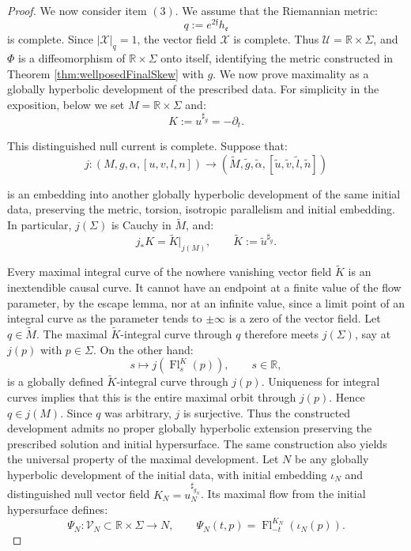 \documentclass[10pt,reqno,a4paper]{amsart}
\theoremstyle{plain}
\theoremstyle{definition}
\theoremstyle{remark}
\theoremstyle{remark}
\def\cX{\mathcal{X}}
\def\cU{\mathcal{U}}
\def\fre{\mathfrak{e}}
\renewcommand{\(}{ (}
\renewcommand{\)}{ )}
\newcommand{\frf}{\mathfrak{f}}
\begin{document}
\begin{proof}
\noindent
We now consider item $(3)$. We assume that the Riemannian metric:
\begin{equation*}
q:=e^{2\frf}h_{\fre}
\end{equation*}
is complete. Since $|\cX|_q=1$, the vector field $\cX$ is complete. Thus $\cU=\mathbb R\times\Sigma$, and $\Phi$ is a diffeomorphism of $\mathbb R\times\Sigma$ onto itself, identifying the metric constructed in Theorem \ref{thm:wellposedFinalSkew} with $g$. We now prove maximality as a globally hyperbolic development of the prescribed data. For simplicity in the exposition, below we set $M=\mathbb R\times\Sigma$ and:
\begin{equation*}
K:=u^{\sharp_g}=-\partial_t.
\end{equation*}

\noindent
This distinguished null current is complete. Suppose that:
\begin{equation*}
j:(M,g,\alpha,[u,v,l,n]) \longrightarrow (\widetilde M,\widetilde g,\widetilde\alpha, [\widetilde u,\widetilde v,\widetilde l,\widetilde n])
\end{equation*}

\noindent
is an embedding into another globally hyperbolic development of the same initial data, preserving the metric, torsion, isotropic parallelism and initial embedding. In particular, $j(\Sigma)$ is Cauchy in $\widetilde M$, and:
\begin{equation*}
j_*K=\widetilde K|_{j(M)}, \qquad \widetilde K:=\widetilde u^{\sharp_{\widetilde g}}.
\end{equation*}

\noindent
Every maximal integral curve of the nowhere vanishing vector field $\widetilde{K}$ is an inextendible causal curve. It cannot have an endpoint at a finite value of the flow parameter, by the escape lemma, nor at an infinite value, since a limit point of an integral curve as the
parameter tends to $\pm\infty$ is a zero of the vector field. Let $q\in\widetilde M$. The maximal $\widetilde K$-integral curve through $q$ therefore meets $j(\Sigma)$, say at $j(p)$ with $p\in\Sigma$. On the other hand:
\begin{equation*}
s\longmapsto j (\operatorname{Fl}^{K}_s(p) ),
\qquad s\in\mathbb R,
\end{equation*}
is a globally defined $\widetilde K$-integral curve through $j(p)$. Uniqueness for integral curves implies that this is the entire maximal orbit through $j(p)$. Hence $q\in j(M)$. Since $q$ was arbitrary, $j$ is surjective. Thus the constructed development admits no proper globally hyperbolic extension preserving the prescribed solution and initial hypersurface. The same construction also yields the universal property of the maximal development. Let $N$ be any globally hyperbolic development of the initial data, with initial embedding $\iota_N$ and distinguished null vector field $K_N = u_N^{\sharp_{g_N}}$. Its maximal flow from the initial hypersurface defines:
\begin{equation*}
\Psi_N:\mathcal V_N\subset\mathbb R\times\Sigma\longrightarrow N,
\qquad
\Psi_N(t,p)=\operatorname{Fl}^{K_N}_{-t}(\iota_N(p)).
\end{equation*}


\end{proof}
\end{document}
